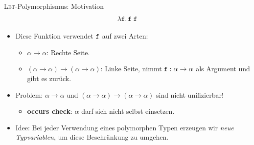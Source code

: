 \documentclass{beamer}
\begin{document}
\begin{frame}{\textsc{Let}-Polymorphismus: Motivation}
  \begin{equation*}
    \lambda \texttt{f}.\, \texttt{f}\;\texttt{f}
  \end{equation*}

  \begin{itemize}
    \item Diese Funktion verwendet $\texttt{f}$ auf zwei Arten:
    \begin{itemize}
      \item $\alpha \to \alpha$: Rechte Seite.
      \item $(\alpha \to \alpha) \to (\alpha \to \alpha)$: Linke Seite, nimmt $\texttt{f} : \alpha \to \alpha$ als Argument und gibt es zurück.
    \end{itemize}
    \pause
    \item Problem: $\alpha \to \alpha$ und $(\alpha \to \alpha) \to (\alpha \to \alpha)$ sind nicht unifizierbar!
    \begin{itemize}
      \item \textbf{occurs check}: $\alpha$ darf sich nicht selbst einsetzen.
    \end{itemize}
  \item Idee: Bei jeder Verwendung eines polymorphen Typen erzeugen wir \emph{neue Typvariablen}, um diese Beschränkung zu umgehen.
  \end{itemize}
\end{frame}
\end{document}
